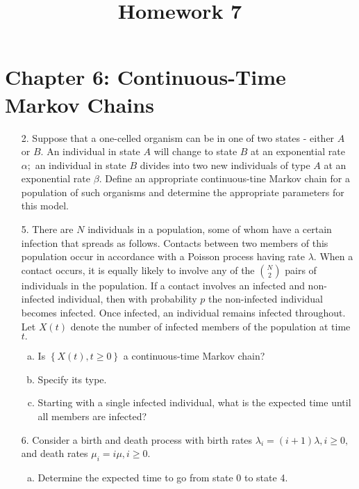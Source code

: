 \documentclass{article}
\begin{document}
\title{Homework 7}
\maketitle
\thispagestyle{fancy}

\section*{Chapter 6: Continuous-Time Markov Chains}

\begin{itemize}
	\item[2.] Suppose that a one-celled organism can be in one of two states - either $A$ or $B.$ An individual in state $A$ will change to state $B$ at an exponential rate $\alpha;$ an individual in state $B$ divides into two new individuals of type $A$ at an exponential rate $\beta.$ Define an appropriate continuous-tine Markov chain for a population of such organisms and determine the appropriate parameters for this model.

	\item[5.] There are $N$ individuals in a population, some of whom have a certain infection that spreads as follows. Contacts between two members of this population occur in accordance with a Poisson process having rate $\lambda.$ When a contact occurs, it is equally likely to involve any of the $\binom{N}{2}$ pairs of individuals in the population. If a contact involves an infected and non-infected individual, then with probability  $p$ the non-infected individual becomes infected. Once infected, an individual remains infected throughout. Let $X(t)$ denote the number of infected members of the population at time $t.$
		\begin{enumerate}[(a)]
			\item Is $\left\{ X(t), t\ge0 \right\}$ a continuous-time Markov chain?

			\item Specify its type.

			\item Starting with a single infected individual, what is the expected time until all members are infected?
				
		\end{enumerate}

	\item[6.] Consider a birth and death process with birth rates $\lambda_i=(i+1)\lambda, i\ge0,$ and death rates $\mu_i=i\mu, i\ge0.$
		\begin{enumerate}[(a)]
			\item Determine the expected time to go from state 0 to state 4.


\end{enumerate}
\end{itemize}
\end{document}
